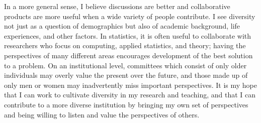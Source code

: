 \documentclass[12pt, letterpaper, sans]{moderncv}
\begin{document}
In a more general sense, I believe discussions are better and collaborative products are more useful when a wide variety of people contribute. I see diversity not just as a question of demographics but also of academic background, life experiences, and other factors. In statistics, it is often useful to collaborate with researchers who focus on computing, applied statistics, and theory; having the perspectives of many different areas encourages development of the best solution to a problem. On an institutional level, committees which consist of only older individuals may overly value the present over the future, and those made up of only men or women may inadvertently miss important perspectives. It is my hope that I can work to cultivate diversity in my research and teaching, and that I can contribute to a more diverse institution by bringing my own set of perspectives and being willing to listen and value the perspectives of others. 
\end{document}
